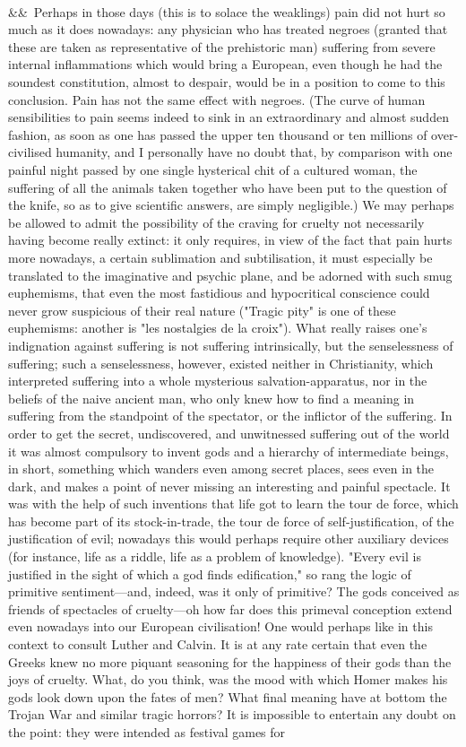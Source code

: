 \documentclass[12pt]{article}
\newcommand{\para}[1][]{\par\noindent\ifx&#1&\else\textsuperscript{\footnotesize #1}~\fi}
\begin{document}
\para Perhaps in those days (this is to solace the weaklings) pain did not hurt so much as it does nowadays: any physician who has treated negroes (granted that these are taken as representative of the prehistoric man) suffering from severe internal inflammations which would bring a European, even though he had the soundest constitution, almost to despair, would be in a position to come to this conclusion. Pain has not the same effect with negroes. (The curve of human sensibilities to pain seems indeed to sink in an extraordinary and almost sudden fashion, as soon as one has passed the upper ten thousand or ten millions of over-civilised humanity, and I personally have no doubt that, by comparison with one painful night passed by one single hysterical chit of a cultured woman, the suffering of all the animals taken together who have been put to the question of the knife, so as to give scientific answers, are simply negligible.) We may perhaps be allowed to admit the possibility of the craving for cruelty not necessarily having become really extinct: it only requires, in view of the fact that pain hurts more nowadays, a certain sublimation and subtilisation, it must especially be translated to the imaginative and psychic plane, and be adorned with such smug euphemisms, that even the most fastidious and hypocritical conscience could never grow suspicious of their real nature ("Tragic pity" is one of these euphemisms: another is "les nostalgies de la croix"). What really raises one's indignation against suffering is not suffering intrinsically, but the senselessness of suffering; such a senselessness, however, existed neither in Christianity, which interpreted suffering into a whole mysterious salvation-apparatus, nor in the beliefs of the naive ancient man, who only knew how to find a meaning in suffering from the standpoint of the spectator, or the inflictor of the suffering. In order to get the secret, undiscovered, and unwitnessed suffering out of the world it was almost compulsory to invent gods and a hierarchy of intermediate beings, in short, something which wanders even among secret places, sees even in the dark, and makes a point of never missing an interesting and painful spectacle. It was with the help of such inventions that life got to learn the tour de force, which has become part of its stock-in-trade, the tour de force of self-justification, of the justification of evil; nowadays this would perhaps require other auxiliary devices (for instance, life as a riddle, life as a problem of knowledge). "Every evil is justified in the sight of which a god finds edification," so rang the logic of primitive sentiment---and, indeed, was it only of primitive? The gods conceived as friends of spectacles of cruelty---oh how far does this primeval conception extend even nowadays into our European civilisation! One would perhaps like in this context to consult Luther and Calvin. It is at any rate certain that even the Greeks knew no more piquant seasoning for the happiness of their gods than the joys of cruelty. What, do you think, was the mood with which Homer makes his gods look down upon the fates of men? What final meaning have at bottom the Trojan War and similar tragic horrors? It is impossible to entertain any doubt on the point: they were intended as festival games for 
\end{document}
